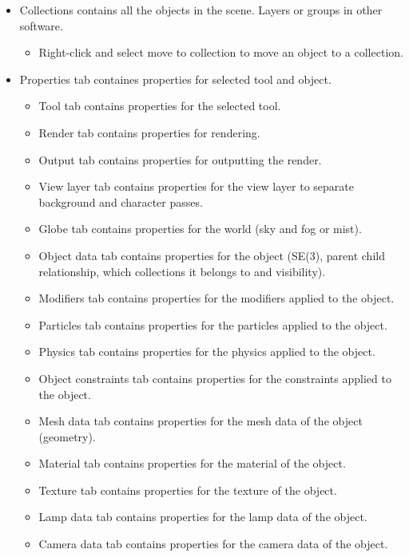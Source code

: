 \documentclass[12pt]{article}
\begin{document}
\begin{itemize}
    \item Collections contains all the objects in the scene. Layers or groups in other software.
        \begin{itemize}
            \item Right-click and select move to collection to move an object to a collection.
        \end{itemize}
    \item Properties tab containes properties for selected tool and object.
        \begin{itemize}
            \item Tool tab contains properties for the selected tool.
            \item Render tab contains properties for rendering.
            \item Output tab contains properties for outputting the render.
            \item View layer tab contains properties for the view layer to separate background and character passes.
            \item Globe tab contains properties for the world (sky and fog or mist).
            \item Object data tab contains properties for the object (SE(3), parent child relationship, which collections it belongs to and visibility).
            \item Modifiers tab contains properties for the modifiers applied to the object.
            \item Particles tab contains properties for the particles applied to the object.
            \item Physics tab contains properties for the physics applied to the object.
            \item Object constraints tab contains properties for the constraints applied to the object.
            \item Mesh data tab contains properties for the mesh data of the object (geometry).
            \item Material tab contains properties for the material of the object.
            \item Texture tab contains properties for the texture of the object.
            \item Lamp data tab contains properties for the lamp data of the object.
            \item Camera data tab contains properties for the camera data of the object.
        \end{itemize}

\end{itemize}
\end{document}
